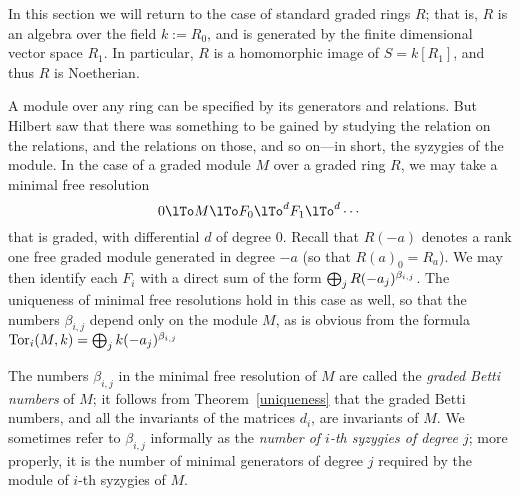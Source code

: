  In this section we will return to the case of standard graded rings $R$; that is, $R$ is an algebra over the field $k := R_0$, and is generated by the finite dimensional vector space $R_1$. In particular, $R$ is a homomorphic image of 
$S = k[R_1]$, and thus $R$ is Noetherian.

A module over any ring can be specified by its generators and relations. But Hilbert saw that there was something to be gained by studying the relation on the relations, and the relations on those, and so on---in short, the syzygies of the module.
In the case of a graded module $M$ over a graded ring $R$, we may take a minimal free resolution
$$
0\lTo M \lTo F_0 \lTo^d F_1\lTo^d\cdots
$$
that is graded, with differential $d$ of degree 0. Recall that $R(-a)$ denotes a rank one free graded module generated in degree $-a$ (so that $R(a)_0 = R_a$). We may then identify each $F_i$ with a direct sum of the form 
$\bigoplus_j R(-a_j)^{\gb_{i,j}}$. 
The uniqueness of minimal free resolutions hold in this case as well, so that 
the numbers $\beta_{i,j}$ depend only on the module $M$, as is obvious from the formula $\Tor_i(M,k) = \bigoplus_j k(-a_j)^{\gb_{i,j}}$

The numbers $\beta_{i,j}$ in  the minimal free resolution of $M$ are called the \emph{graded Betti numbers} of $M$; it follows from Theorem~\ref{uniqueness} that the graded Betti numbers, and all the invariants of the matrices $d_{i}$, are invariants of $M$. 
We sometimes refer to $\beta_{i,j}$ informally as the \emph{number of $i$-th syzygies of degree $j$}; more properly, it is the number of minimal generators of degree $j$ required by the module of $i$-th syzygies of $M$.

